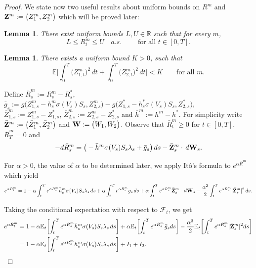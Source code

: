 \documentclass{article}
\newcommand{\E}{\mathbb{E}}
\newtheorem{lemma}[definition]{Lemma}
\def\bRm{\bar{R}^m}
\def\Zm{\bar{\bf Z}^m}
\def\W{{\bf W}}
\def\hm{\bar{h}^m}
\def\bZ{{\bf Z}}
\def\hm{\bar{h}^m}
\begin{document}
\begin{proof}
We state now two useful results about uniform bounds on $R^m$ and $\bZ^m := \bigl(Z_1^m,Z_2^m\bigr)$ which will be proved later:
\begin{lemma}\label{lem:Appendix-uniform_Rm_bound}
 	There exist uniform bounds $L, U\in \mathbb R$ such that for every $m$, 
 	\[
 		L\leq R^m_t \leq U \quad a.s. \qquad \text{ for all }t\in [0, T].
 	\]
\end{lemma}

\begin{lemma}\label{lem:Appendix-uniform_Zm_bound}
	There exists a uniform bound $K >0$, such that
 	\[
 		\E\biggl[\int_0^T\bigl(Z^m_{1,t}\bigr)^2 \, dt +\int_0^T\bigl(Z^m_{2,t}\bigr)^2 \, dt\biggr]< K \qquad \text{for all } m.
	\]
\end{lemma}
 
Define $\bar{R}^m_s:=R_s^m-R_s^*$,  $\bar{g}_s:=  g\bigl(Z_{1,s}^m-h^m_s\sigma(V_s)S_s, Z_{2,s}^m\bigr)-  g\bigl(Z_{1,s}^*-h^*_s\sigma(V_s)S_s, Z_{2,s}^*\bigr),$
$\bar{Z}^m_{1,s}:= Z^m_{1,s} - Z^*_{1,s}$,  $\bar{Z}^m_{2,s}:= Z^m_{2,s} - Z^*_{2,s}$ and $\bar{h}^m:=h^m-h^*$. For simplicity write $\Zm:=\bigl(\bar{Z}^m_1, \bar{Z}^m_2\bigr)$ and $\W:=\bigl(W_1, W_2\bigr)$.  Observe that $\bar{R}^m_t\geq 0$ for $t\in [0,T]$, $\bar{R}^m_T=0$  and
\[
	-d\bRm_s= \big(-\hm\sigma(V_s)S_s\lambda_s+ \bar{g}_s\bigr) \, ds -\Zm_s\cdot \,  d\W_s .
\]
  
  
For $\alpha>0$, the value of $\alpha$ to be determined later, we apply  It\^o's formula to $e^{\alpha \bar{R}^m}$ which yield
\[
	e^{\alpha \bRm_t} = 1-\alpha \int_t^T e^{\alpha \bRm_s}\hm_s\sigma(V_s)S_s\lambda_s \, ds +\alpha \int_t^Te^{\alpha \bRm_s} \bar{g}_s \, ds 
 	+\alpha \int_t^Te^{\alpha \bRm_s}\Zm_s\cdot \, d\W_s -\frac{\alpha^2}{2}\int_t^T e^{\alpha \bRm_s}  |\Zm_s|^2 \, ds .
 \]
 
Taking the conditional expectation with respect to $\mathcal F_t$, we get
\begin{align}\label{eq:Ito-formula}
	e^{\alpha \bRm_t} & = 1  - \alpha \E_t\biggl[\int_t^T e^{\alpha \bRm_s}\hm_s\sigma(V_s)S_s\lambda_s \, ds\biggr]+\alpha \E_t\biggl[\int_t^Te^{\alpha \bRm_s} \bar{g}_sds \biggr]
 	-\frac{\alpha^2}{2}\E_t\biggl[\int_t^T e^{\alpha \bRm_s}  |\Zm_s|^2ds\biggr] \nonumber\\
 	&= 1 - \alpha \E_t\biggl[\int_t^T e^{\alpha \bRm_s}\hm_s\sigma(V_s)S_s\lambda_s \, ds\biggr] +I_1+I_2.
 \end{align}
 

\end{proof}
\end{document}
